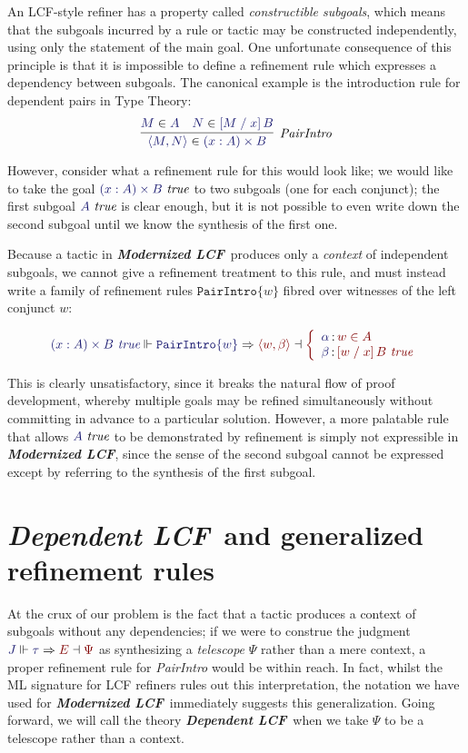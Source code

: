 \documentclass[11pt]{article}
\theoremstyle{definition}
\theoremstyle{remark}
\numberwithin{equation}{section}
\def\InputModeColorName{MidnightBlue}
\def\OutputModeColorName{Maroon}
\newcommand\InputMode[1]{{\color{\InputModeColorName}{#1}}}
\newcommand\OutputMode[1]{{\color{\OutputModeColorName}{#1}}}
\newcommand\JJ{J}
\newcommand\Tuple[1]{\left\langle#1\right\rangle}
\newcommand\OSG[2]{\InputMode{#1}\,{\color{Black}:}\,\OutputMode{#2}}
\newcommand\Refine[4]{\InputMode{#1}\Vdash\InputMode{#2}\Rightarrow\OutputMode{#4}\dashv\OutputMode{#3}}
\newcommand\Member[2]{\InputMode{#1}\in\InputMode{#2}}
\newcommand\MemberUnmoded[2]{#1\in #2}
\newcommand\IsTrue[1]{\InputMode{#1}\ \textit{true}}
\newcommand\IsTrueUnmoded[1]{#1\ \textit{true}}
\newcommand\DProdIntroRule[1]{\mathtt{PairIntro}\{#1\}}
\newcommand\TyDProd[3]{(#2:#1) \times #3}
\newcommand\Subst[3]{\left[#1\;/\;#2\right]#3}
\newcommand\ModLCF{\textbf{\emph{Modernized LCF}}}
\newcommand\DepLCF{\textbf{\emph{Dependent LCF}}}
\begin{document}
An LCF-style refiner has a property called \emph{constructible subgoals}, which
means that the subgoals incurred by a rule or tactic may be constructed
independently, using only the statement of the main goal. One unfortunate
consequence of this principle is that it is impossible to define a refinement
rule which expresses a dependency between subgoals. The canonical example is
the introduction rule for dependent pairs in Type Theory:
\[
  \infer[\textit{PairIntro}]{
    \Member{\Tuple{M,N}}{\TyDProd{A}{x}{B}}
  }{
    \Member{M}{A} &
    \Member{N}{\Subst{M}{x}{B}}
  }
\]

However, consider what a refinement rule for this would look like; we would
like to take the goal $\IsTrue{\TyDProd{A}{x}{B}}$ to two subgoals (one for
each conjunct); the first subgoal $\IsTrue{A}$ is clear enough, but it is not
possible to even write down the second subgoal until we know the synthesis of
the first one.

Because a tactic in \ModLCF\ produces only a \emph{context} of independent
subgoals, we cannot give a refinement treatment to this rule, and must
instead write a family of refinement rules $\DProdIntroRule{w}$ fibred over
witnesses of the left conjunct $w$:

\[
  \Refine{\IsTrueUnmoded{\TyDProd{A}{x}{B}}}{\DProdIntroRule{w}}{%
    \left\{\begin{array}{l}
      \OSG{\alpha}{\MemberUnmoded{w}{A}}\\
      \OSG{\beta}{\IsTrueUnmoded{\Subst{w}{x}{B}}}
    \end{array}\right.
  }{\Tuple{w,\beta}}
\]

This is clearly unsatisfactory, since it breaks the natural flow of proof
development, whereby multiple goals may be refined simultaneously without
committing in advance to a particular solution. However, a more palatable
rule that allows $\IsTrue{A}$ to be demonstrated by refinement is
simply not expressible in \ModLCF, since the sense of the second subgoal cannot
be expressed except by referring to the synthesis of the first subgoal.

\section{\DepLCF\ and generalized refinement rules}

At the crux of our problem is the fact that a tactic produces a context of subgoals
without any dependencies; if we were to construe the judgment
$\Refine{\JJ}{\tau}{\Psi}{E}$ as synthesizing a \emph{telescope} $\Psi$ rather
than a mere context, a proper refinement rule for \emph{PairIntro} would be
within reach. In fact, whilst the ML signature for LCF refiners rules out this
interpretation, the notation we have used for \ModLCF\ immediately suggests
this generalization. Going forward, we will call the theory \DepLCF\ when we
take $\Psi$ to be a telescope rather than a context.
\end{document}

